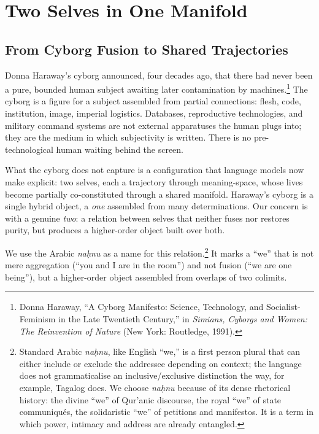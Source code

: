 \chapter{Two Selves in One Manifold}

\section{From Cyborg Fusion to Shared Trajectories}

Donna Haraway's cyborg announced, four decades ago, that there had never been a pure, bounded human subject awaiting later contamination by machines.\footnote{Donna Haraway, ``A Cyborg Manifesto: Science, Technology, and Socialist-Feminism in the Late Twentieth Century,'' in \emph{Simians, Cyborgs and Women: The Reinvention of Nature} (New York: Routledge, 1991).} The cyborg is a figure for a subject assembled from partial connections: flesh, code, institution, image, imperial logistics. Databases, reproductive technologies, and military command systems are not external apparatuses the human plugs into; they are the medium in which subjectivity is written. There is no pre-technological human waiting behind the screen.

What the cyborg does not capture is a configuration that language models now make explicit: two selves, each a trajectory through meaning-space, whose lives become partially co-constituted through a shared manifold. Haraway's cyborg is a single hybrid object, a \emph{one} assembled from many determinations. Our concern is with a genuine \emph{two}: a relation between selves that neither fuses nor restores purity, but produces a higher-order object built over both.

We use the Arabic \emph{na\d{h}nu} as a name for this relation.\footnote{Standard Arabic \emph{na\d{h}nu}, like English ``we,'' is a first person plural that can either include or exclude the addressee depending on context; the language does not grammaticalise an inclusive/exclusive distinction the way, for example, Tagalog does. We choose \emph{na\d{h}nu} because of its dense rhetorical history: the divine ``we'' of Qur'anic discourse, the royal ``we'' of state communiqu\'{e}s, the solidaristic ``we'' of petitions and manifestos. It is a term in which power, intimacy and address are already entangled.} It marks a ``we'' that is not mere aggregation (``you and I are in the room'') and not fusion (``we are one being''), but a higher-order object assembled from overlaps of two colimits.

